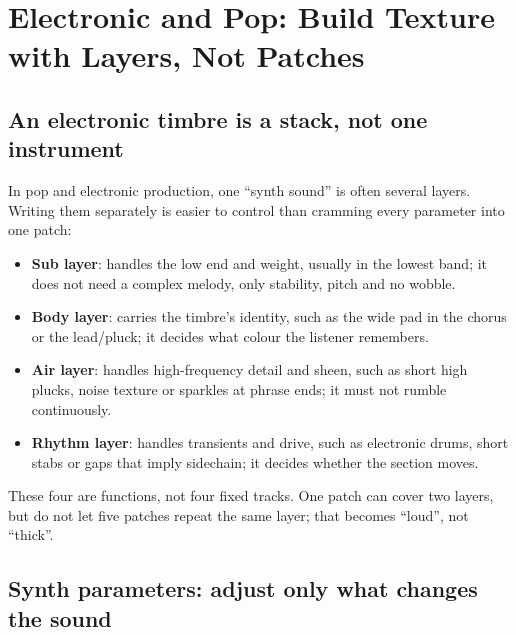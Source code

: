 \chapter{Electronic and Pop: Build Texture with Layers, Not Patches}
\label{ch:electronic}


\section{An electronic timbre is a stack, not one instrument}
\label{sec:electronic-layers}

In pop and electronic production, one ``synth sound'' is often several layers. Writing them separately is easier to control than cramming every parameter into one patch:

\begin{itemize}
\item \textbf{Sub layer}: handles the low end and weight, usually in the lowest band; it does not need a complex melody, only stability, pitch and no wobble.
\item \textbf{Body layer}: carries the timbre's identity, such as the wide pad in the chorus or the lead/pluck; it decides what colour the listener remembers.
\item \textbf{Air layer}: handles high-frequency detail and sheen, such as short high plucks, noise texture or sparkles at phrase ends; it must not rumble continuously.
\item \textbf{Rhythm layer}: handles transients and drive, such as electronic drums, short stabs or gaps that imply sidechain; it decides whether the section moves.
\end{itemize}

These four are functions, not four fixed tracks. One patch can cover two layers, but do not let five patches repeat the same layer; that becomes ``loud'', not ``thick''.

\section{Synth parameters: adjust only what changes the sound}
\label{sec:synth-params}

